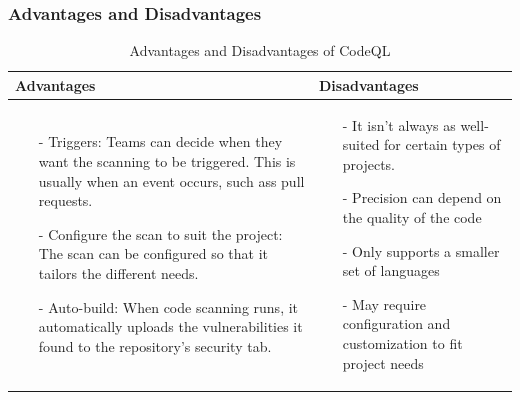 \subsubsection{Advantages and Disadvantages}
\begin{table}[H]
\centering
\begin{tabular}{|>{\raggedright\arraybackslash}p{6cm}|>{\raggedright\arraybackslash}p{6cm}|}
\hline
\textbf{Advantages} & \textbf{Disadvantages} \\
\hline
\begin{itemize}
\item [-] Triggers: Teams can decide when they want the scanning to be triggered. This is usually when an event occurs, such ass pull requests.
\item [-]Configure the scan to suit the project: The scan can be configured so that it tailors the 
  different needs. 
\item [-] Auto-build: When code scanning runs, it automatically uploads the vulnerabilities it found to the repository's security tab. 
\end{itemize}
&
   \begin{itemize}
\item [-] It isn't always as well-suited for certain types of projects. 
\item [-]Precision can depend on the quality of the code
\item [-] Only supports a smaller set of languages 
\item [-] May require configuration and customization to fit project needs
\end{itemize}
\\
\hline
\end{tabular}
\caption{Advantages and Disadvantages of CodeQL}
\label{tab: CodeQL}
\end{table}


